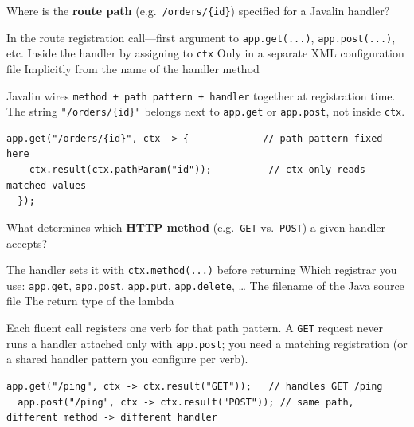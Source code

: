 \question[4]
Where is the \textbf{route path} (e.g.\ \texttt{/orders/\{id\}}) specified for a Javalin handler?
\begin{choices}
  \CorrectChoice In the route registration call---first argument to \texttt{app.get(...)}, \texttt{app.post(...)}, etc.
  \choice Inside the handler by assigning to \texttt{ctx}
  \choice Only in a separate XML configuration file
  \choice Implicitly from the name of the handler method
\end{choices}
\begin{solution}
  Javalin wires \texttt{method + path pattern + handler} together at registration time. The string \texttt{"/orders/\{id\}"} belongs next to \texttt{app.get} or \texttt{app.post}, not inside \texttt{ctx}.

  \begin{lstlisting}[style=java]
  app.get("/orders/{id}", ctx -> {             // path pattern fixed here
    ctx.result(ctx.pathParam("id"));          // ctx only reads matched values
  });
  \end{lstlisting}
\end{solution}


\newpage

\question[4]
What determines which \textbf{HTTP method} (e.g.\ \texttt{GET} vs.\ \texttt{POST}) a given handler accepts?
\begin{choices}
  \choice The handler sets it with \texttt{ctx.method(...)} before returning
  \CorrectChoice Which registrar you use: \texttt{app.get}, \texttt{app.post}, \texttt{app.put}, \texttt{app.delete}, \ldots
  \choice The filename of the Java source file
  \choice The return type of the lambda
\end{choices}
\begin{solution}
  Each fluent call registers one verb for that path pattern. A \texttt{GET} request never runs a handler attached only with \texttt{app.post}; you need a matching registration (or a shared handler pattern you configure per verb).

  \begin{lstlisting}[style=java]
  app.get("/ping", ctx -> ctx.result("GET"));   // handles GET /ping
  app.post("/ping", ctx -> ctx.result("POST")); // same path, different method -> different handler
  \end{lstlisting}
\end{solution}

